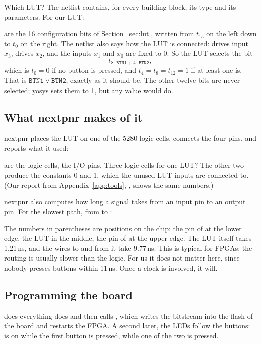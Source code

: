 Which LUT? The netlist  contains, for every building block, its
type and its parameters. For our LUT:


 are the 16 configuration bits of Section~\ref{sec:lut}, written
from $t_{15}$ on the left down to $t_0$ on the right. The netlist also says
how the LUT is connected:  drives input $x_3$,  drives $x_2$,
and the inputs $x_1$ and $x_0$ are fixed to 0. So the LUT selects the bit
\[
  t_{8\cdot\mathtt{BTN1} + 4\cdot\mathtt{BTN2}} ,
\]
which is $t_0 = 0$ if no button is pressed, and $t_4 = t_8 = t_{12} = 1$ if at
least one is. That is $\mathtt{BTN1} \vee \mathtt{BTN2}$, exactly as it should
be. The other twelve bits are never selected; yosys sets them to 1, but any
value would do.

\subsection*{What nextpnr makes of it}

nextpnr places the LUT on one of the 5280 logic cells, connects the four pins,
and reports what it used:


 are the logic cells,  the I/O pins. Three logic
cells for one LUT? The other two produce the constants 0 and 1, which the
unused LUT inputs are connected to. (Our report from
Appendix~\ref{app:tools}, , shows the same numbers.)

nextpnr also computes how long a signal takes from an input pin to an output
pin. For the slowest path, from  to :


The numbers in parentheses are positions on the chip: the pin of 
at the lower edge, the LUT in the middle, the pin of  at the upper
edge. The LUT itself takes 1.21\,ns, and the wires to and from it take 9.77\,ns.
This is typical for FPGAs: the routing is usually slower than the logic. For
us it does not matter here, since nobody presses buttons within 11\,ns. Once a
clock is involved, it will.

\subsection*{Programming the board}

 does everything  does and then calls
, which writes the bitstream into the flash of the board
and restarts the FPGA. A second later, the LEDs follow the buttons: 
is on while the first button is pressed,  while one of the two is
pressed.

